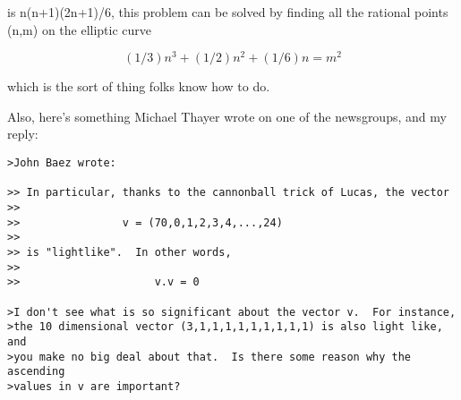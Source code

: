 is n(n+1)(2n+1)/6, this problem can be solved by finding all the
rational points (n,m) on the elliptic curve

$$
(1/3) n^{3} + (1/2) n^{2} + (1/6) n = m^{2}
$$
    

which is the sort of thing folks know how to do.
                                                    
Also, here's something 
Michael Thayer wrote on one of the newsgroups, and my reply:
\begin{verbatim}
>John Baez wrote:

>> In particular, thanks to the cannonball trick of Lucas, the vector
>>
>>                v = (70,0,1,2,3,4,...,24)
>>
>> is "lightlike".  In other words,
>>
>>                     v.v = 0

>I don't see what is so significant about the vector v.  For instance,
>the 10 dimensional vector (3,1,1,1,1,1,1,1,1,1) is also light like, and
>you make no big deal about that.  Is there some reason why the ascending
>values in v are important?
\end{verbatim}
    
